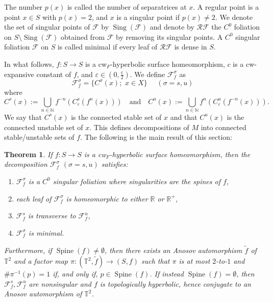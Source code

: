 \documentclass{amsart}
\theoremstyle{plain}
\newtheorem{theorem}{Theorem}[section]
\theoremstyle{definition}
\newcommand{\mc}{\mathcal}
\newcommand{\spine}{\operatorname{Spine}}
\newcommand{\T}{\mathbb{T}}
\newcommand{\N}{\mathbb{N}}
\newcommand{\eps}{\varepsilon}
\newcommand{\sing}{\operatorname{Sing}}
\begin{document}
The number $p(x)$ is called the number of separatrices at $x$. A regular point is a point $x\in S$ with $p(x)=2$, and $x$ is a singular point if $p(x)\neq 2$. We denote the set of singular points of $\mc{F}$ by $\sing(\mc{F})$ and denote by $\mc{RF}$ the $C^0$ foliation on $S\setminus \sing(\mc{F})$ obtained from $\mc{F}$ by removing its singular points. A $C^0$ singular foliation $\mc{F}$ on $S$ is called minimal if every leaf of $\mc{RF}$ is dense in $S$.

In what follows, $f\colon S\to S$ is a cw$_F$-hyperbolic surface homeomorphism, $c$ is a cw-expansive constant of $f$, and $\eps\in(0,\frac{c}{2})$.  
We define $\mc{F}^\sigma_f$ as $$\mc{F}^\sigma_f=\{C^\sigma(x); \,\,x\in X\} \,\,\,\,\,\,\,\, (\sigma=s,u)$$
where
$$C^s(x):=\bigcup_{n\in\N}f^{-n}(C^s_{\eps}(f^n(x))) \,\,\,\,\,\, \text{and} \,\,\,\,\,\, C^u(x):=\bigcup_{n\in\N}f^{n}(C^u_{\eps}(f^{-n}(x))).$$
We say that $C^s(x)$ is the connected stable set of $x$ and that $C^u(x)$ is the connected unstable set of $x$. This defines decompositions of $M$ into connected stable/unstable sets of $f$. The following is the main result of this section:

\begin{theorem}\label{foliation}
If $f\colon S\to S$ is a cw$_F$-hyperbolic surface homeomorphism, then the decomposition $\mc{F}^\sigma_f$ $(\sigma=s,u)$ satisfies:
\begin{enumerate}
    \item\label{fol:1} $\mc{F}^\sigma_f$ is a $C^0$ singular foliation where singularities are the spines of $f$,
    \item\label{fol:2} each leaf of $\mc{F}^\sigma_f$ is homeomorphic to either $\mathbb{R}$ or $\mathbb{R}^+$,
    \item\label{fol:3} $\mc{F}^s_f$ is transverse to $\mc{F}^u_f$,
    \item\label{fol:4} $\mc{F}^\sigma_f$ is minimal.
\end{enumerate}
Furthermore, if $\spine(f)\neq\emptyset$, then there exists an Anosov automorphism
$\widetilde f$ of $\T^2$ and a factor map $\pi\colon(\T^2,\widetilde f)\to(S,f)$ such that
$\pi$ is at most $2$-to-$1$ and $\#\pi^{-1}(p)=1$ if, and only if, $p\in\spine(f)$. If instead
$\spine(f)=\emptyset$, then $\mc{F}^s_f,\mc{F}^u_f$ are nonsingular and $f$ is topologically
hyperbolic,  hence conjugate to an Anosov automorphism
of $\T^2$.
\end{theorem}
\end{document}
